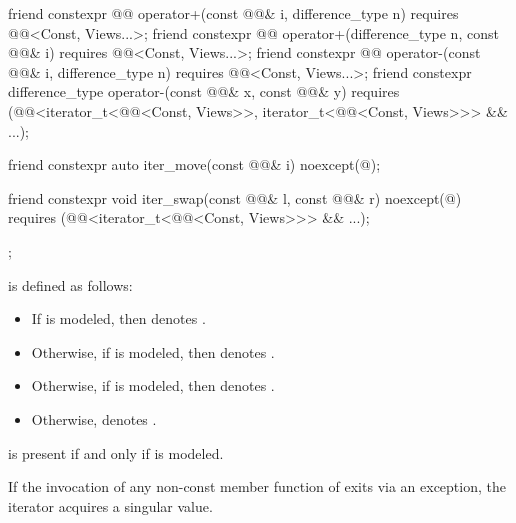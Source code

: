 \begin{codeblock}
{{    friend constexpr @@ operator+(const @@& i, difference_type n)
      requires @@<Const, Views...>;
    friend constexpr @@ operator+(difference_type n, const @@& i)
      requires @@<Const, Views...>;
    friend constexpr @@ operator-(const @@& i, difference_type n)
      requires @@<Const, Views...>;
    friend constexpr difference_type operator-(const @@& x, const @@& y)
      requires (@@<iterator_t<@@<Const, Views>>,
                                   iterator_t<@@<Const, Views>>> && ...);

    friend constexpr auto iter_move(const @@& i) noexcept(@\seebelow@);

    friend constexpr void iter_swap(const @@& l, const @@& r) noexcept(@\seebelow@)
      requires (@@<iterator_t<@@<Const, Views>>> && ...);
  };
}
\end{codeblock}

\pnum
{} is defined as follows:
\begin{itemize}
\item
If  is modeled,
then  denotes .
\item
Otherwise,
if  is modeled,
then  denotes .
\item
Otherwise,
if  is modeled,
then  denotes .
\item
Otherwise,  denotes .
\end{itemize}

\pnum
{} is present
if and only if  is modeled.

\pnum
If the invocation of any non-const member function of 
exits via an exception,
the iterator acquires a singular value.

